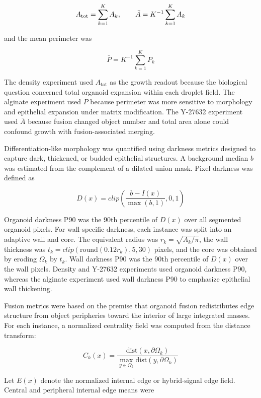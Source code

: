 \documentclass[
]{article}
\begin{document}
\[A_{\text{tot}} = \sum_{k = 1}^{K}A_{k},\text{\quad\quad}\bar{A} = K^{- 1}\sum_{k = 1}^{K}A_{k}\]

and the mean perimeter was

\[\bar{P} = K^{- 1}\sum_{k = 1}^{K}P_{k}\]

The density experiment used \(A_{\text{tot}}\) as the growth readout because the biological question concerned total organoid expansion within each droplet field. The alginate experiment used \(\bar{P}\) because perimeter was more sensitive to morphology and epithelial expansion under matrix modification. The Y-27632 experiment used \(\bar{A}\) because fusion changed object number and total area alone could confound growth with fusion-associated merging.

Differentiation-like morphology was quantified using darkness metrics designed to capture dark, thickened, or budded epithelial structures. A background median \(b\) was estimated from the complement of a dilated union mask. Pixel darkness was defined as

\[D\left( x \right) = clip\left( \frac{b - I\left( x \right)}{\max\left( b,1 \right)},0,1 \right)\]

Organoid darkness P90 was the 90th percentile of \(D\left( x \right)\) over all segmented organoid pixels. For wall-specific darkness, each instance was split into an adaptive wall and core. The equivalent radius was \(r_{k} = \sqrt{A_{k}/\pi}\), the wall thickness was \(t_{k} = clip\left( \text{round}\left( 0.12r_{k} \right),5,30 \right)\) pixels, and the core was obtained by eroding \(\Omega_{k}\) by \(t_{k}\). Wall darkness P90 was the 90th percentile of \(D\left( x \right)\) over the wall pixels. Density and Y-27632 experiments used organoid darkness P90, whereas the alginate experiment used wall darkness P90 to emphasize epithelial wall thickening.

Fusion metrics were based on the premise that organoid fusion redistributes edge structure from object peripheries toward the interior of large integrated masses. For each instance, a normalized centrality field was computed from the distance transform:

\[C_{k}\left( x \right) = \frac{\text{dist}\left( x,\partial\Omega_{k} \right)}{\max_{y \in \Omega_{k}}\text{dist}\left( y,\partial\Omega_{k} \right)}\]

Let \(E\left( x \right)\) denote the normalized internal edge or hybrid-signal edge field. Central and peripheral internal edge means were
\end{document}
